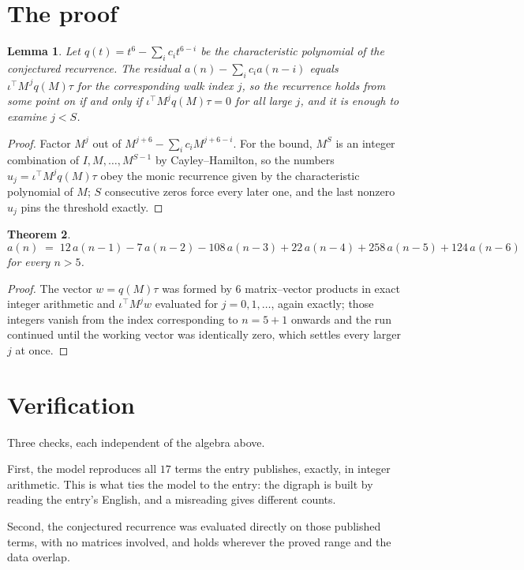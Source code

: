\documentclass[11pt,a4paper]{article}
\theoremstyle{plain}
\newtheorem{theorem}{Theorem}
\newtheorem{lemma}[theorem]{Lemma}
\theoremstyle{definition}
\begin{document}
\section{The proof}

\begin{lemma}\label{lem:crit}
Let $q(t)=t^{6}-\sum_i c_it^{6-i}$ be the characteristic polynomial of the
conjectured recurrence. The residual $a(n)-\sum_ic_ia(n-i)$ equals
$\iota^{\!\top}M^{\,j}q(M)\tau$ for the corresponding walk index $j$, so the recurrence
holds from some point on if and only if $\iota^{\!\top}M^{j}q(M)\tau=0$ for all large $j$,
and it is enough to examine $j<S$.
\end{lemma}

\begin{proof}
Factor $M^{j}$ out of $M^{j+6}-\sum_ic_iM^{j+6-i}$. For the bound, $M^{S}$
is an integer combination of $I,M,\dots,M^{S-1}$ by Cayley--Hamilton, so the numbers
$u_j=\iota^{\!\top}M^{j}q(M)\tau$ obey the monic recurrence given by the characteristic
polynomial of $M$; $S$ consecutive zeros force every later one, and the last nonzero $u_j$
pins the threshold exactly.
\end{proof}

\begin{theorem}
\[
a(n)\;=\;12\,a(n-1) - 7\,a(n-2) - 108\,a(n-3) + 22\,a(n-4) + 258\,a(n-5) + 124\,a(n-6)
\]
for every $n>5$.
\end{theorem}

\begin{proof}
The vector $w=q(M)\tau$ was formed by $6$ matrix--vector products in exact integer
arithmetic and $\iota^{\!\top}M^{j}w$ evaluated for $j=0,1,\dots$, again exactly; those
integers vanish from the index corresponding to $n=5+1$ onwards and the run continued
until the working vector was identically zero, which settles every larger $j$ at once.
\end{proof}

\section{Verification}

Three checks, each independent of the algebra above.

First, the model reproduces all $17$ terms the entry publishes, exactly, in integer
arithmetic. This is what ties the model to the entry: the digraph is built by reading the
entry's English, and a misreading gives different counts.

Second, the conjectured recurrence was evaluated directly on those published terms, with no
matrices involved, and holds wherever the proved range and the data overlap.
\end{document}
